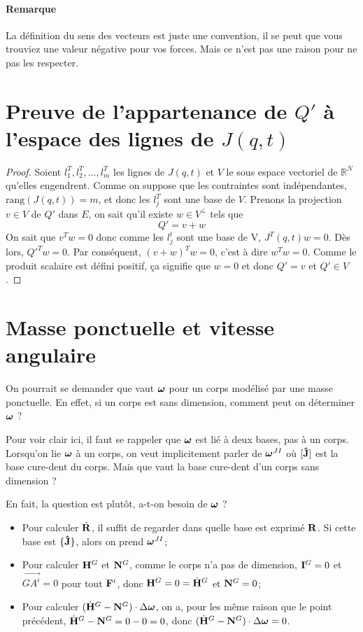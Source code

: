 \paragraph{Remarque}
La définition du sens des vecteurs est juste une convention, il se peut que vous trouviez une valeur négative pour vos forces.
Mais ce n'est pas une raison pour ne pas les respecter.

\annexe
\section{Preuve de l'appartenance de $Q'$ à l'espace des lignes de $J(q, t)$}
\label{ann:orthogonal}
\begin{proof}
Soient $l_1^T, l_2^T, \ldots, l_m^T$ les lignes de $J(q, t)$ et $V$ le sous espace vectoriel de $\mathbb{R}^N$ qu'elles engendrent.
Comme on suppose que les contraintes sont indépendantes, $\mathrm{rang}(J(q, t)) = m$, et donc les $l_j^T$ sont une base de $V$.
Prenons la projection $v \in V$ de $Q'$ dans $E$, on sait qu'il existe $w \in V^\perp$ tels que
\[ Q' = v + w \]
On sait que $v^Tw = 0$ donc comme les $l_j^t$ sont une base de V, $J^T(q, t)w = 0$.
Dès lors, $Q'^T w = 0$.
Par conséquent, $(v + w)^T w = 0$, c'est à dire $w^T w = 0$.
Comme le produit scalaire est défini positif, ça signifie que $w = 0$ et donc $Q' = v$ et $Q' \in V$.
\end{proof}

\section{Masse ponctuelle et vitesse angulaire}
On pourrait se demander que vaut ${\bm \omega}$ pour un corps modélisé par une masse ponctuelle.
En effet, si un corps est sans dimension, comment peut on déterminer ${\bm \omega}$ ?

Pour voir clair ici, il faut se rappeler que ${\bm \omega}$ est lié à deux bases, pas à un corps.
Lorsqu'on lie ${\bm \omega}$ à un corps, on veut implicitement parler de ${\bm \omega}^{JI}$ où $[{\bf\hat{J}}]$ est la base cure-dent du corps.
Mais que vaut la base cure-dent d'un corps sans dimension ?

En fait, la question est plutôt, a-t-on besoin de ${\bm \omega}$ ?
\begin{itemize}
	\item Pour calculer $\dot{\bf R}$,
		il suffit de regarder dans quelle base est exprimé ${\bf R}$.
		Si cette base est $\{{\bf\hat{J}}\}$, alors on prend ${\bm \omega}^{JI}$;
	\item Pour calculer ${\bf H}^G$ et ${\bf N}^G$, comme le corps n'a pas de dimension, ${\bf I}^G = 0$ et $\vec{GA^i} = 0$ pour tout ${\bf F}^i$, donc
		${\bf H}^G = 0 = \dot{{\bf H}}^G$ et ${\bf N}^G = 0$;
	\item Pour calculer $(\dot{{\bf H}}^G - {\bf N}^G) \cdot \Delta {\bm \omega}$, on a, pour les même raison que le point précédent,
		$\dot{{\bf H}}^G - {\bf N}^G = 0 - 0 = 0$, donc $(\dot{{\bf H}}^G - {\bf N}^G) \cdot \Delta {\bm \omega} = 0$.
\end{itemize}


